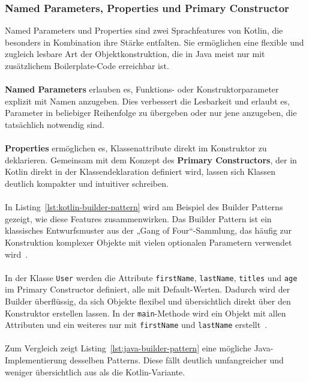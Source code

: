\documentclass[11pt]{article}
\begin{document}
    \subsubsection{Named Parameters, Properties und Primary Constructor}
    Named Parameters und Properties sind zwei Sprachfeatures von Kotlin, die besonders in Kombination ihre Stärke entfalten.
    Sie ermöglichen eine flexible und zugleich lesbare Art der Objektkonstruktion, die in Java meist nur mit zusätzlichem Boilerplate-Code erreichbar ist.\\
    \\
    \textbf{Named Parameters} erlauben es, Funktions- oder Konstruktorparameter explizit mit Namen anzugeben.
    Dies verbessert die Lesbarkeit und erlaubt es, Parameter in beliebiger Reihenfolge zu übergeben oder nur jene anzugeben, die tatsächlich notwendig sind.\\
    \\
    \textbf{Properties} ermöglichen es, Klassenattribute direkt im Konstruktor zu deklarieren.
    Gemeinsam mit dem Konzept des \textbf{Primary Constructors}, der in Kotlin direkt in der Klassendeklaration definiert wird, lassen sich Klassen deutlich kompakter und intuitiver schreiben.\\
    \\
    In Listing~\ref{lst:kotlin-builder-pattern} wird am Beispiel des Builder Patterns gezeigt, wie diese Features zusammenwirken.
    Das Builder Pattern ist ein klassisches Entwurfsmuster aus der „Gang of Four“-Sammlung, das häufig zur Konstruktion komplexer Objekte mit vielen optionalen Parametern verwendet wird~\cite[139]{gang-of-four}.\\
    \\
    In der Klasse \texttt{User} werden die Attribute \texttt{firstName}, \texttt{lastName}, \texttt{titles} und \texttt{age} im Primary Constructor definiert, alle mit Default-Werten.
    Dadurch wird der Builder überflüssig, da sich Objekte flexibel und übersichtlich direkt über den Konstruktor erstellen lassen.
    In der \texttt{main}-Methode wird ein Objekt mit allen Attributen und ein weiteres nur mit \texttt{firstName} und \texttt{lastName} erstellt~\cite[46]{kotlin-patterns}.\\
    \\
    Zum Vergleich zeigt Listing~\ref{lst:java-builder-pattern} eine mögliche Java-Implementierung desselben Patterns.
    Diese fällt deutlich umfangreicher und weniger übersichtlich aus als die Kotlin-Variante.\\
    \\
\end{document}

